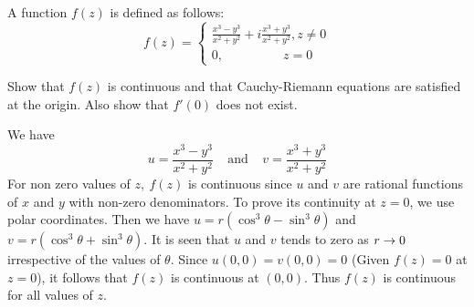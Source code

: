 \begin{example}
A function $f(z)$ is defined as follows:
\[
f(z) = \begin{cases} \frac{x^3-y^3}{x^2+y^2} + i\frac{x^3+y^3}{x^2+y^2}, z\neq 0 \\
0,~~~~~~~~~~~~~~~~~~~~~z=0
\end{cases}
\]

\noindent
Show that $f(z)$ is continuous and that Cauchy-Riemann equations are satisfied at the origin. Also show that $f'(0)$ does not exist.
\end{example}
\begin{solution}
We have
\[u = \frac{x^3-y^3}{x^2+y^2} ~~~~~\text{and}~~~~~v=\frac{x^3+y^3}{x^2+y^2}\]
For non zero values of $z,~f(z)$ is continuous since $u$ and $v$ are rational functions of $x$ and $y$ with non-zero denominators. To prove its continuity at $z=0$, we use polar coordinates. Then we have $u=r(\cos^3\theta -  \sin^3\theta)$ and $v=r(\cos^3\theta + \sin^3\theta)$. It is seen that $u$ and $v$ tends to zero as $r \rightarrow 0$ irrespective of the values of $\theta$. Since $u(0,0) = v(0,0) = 0$ (Given $f(z)=0$ at $z=0$), it follows that $f(z)$ is continuous at $(0,0)$. Thus $f(z)$ is continuous for all values of $z$.


\end{solution}
